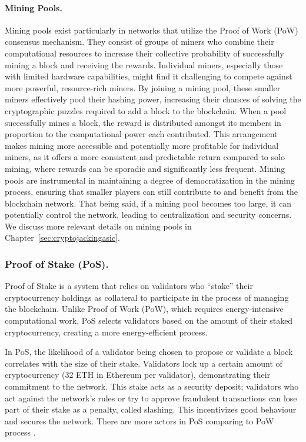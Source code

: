 \paragraph{Mining Pools.}
Mining pools exist particularly in networks that utilize the Proof of Work (PoW) consensus mechanism. They consist of groups of miners who combine their computational resources to increase their collective probability of successfully mining a block and receiving the rewards. Individual miners, especially those with limited hardware capabilities, might find it challenging to compete against more powerful, resource-rich miners. By joining a mining pool, these smaller miners effectively pool their hashing power, increasing their chances of solving the cryptographic puzzles required to add a block to the blockchain. When a pool successfully mines a block, the reward is distributed amongst its members in proportion to the computational power each contributed. This arrangement makes mining more accessible and potentially more profitable for individual miners, as it offers a more consistent and predictable return compared to solo mining, where rewards can be sporadic and significantly less frequent. Mining pools are instrumental in maintaining a degree of democratization in the mining process, ensuring that smaller players can still contribute to and benefit from the blockchain network. That being said, if a mining pool becomes too large, it can potentially control the network, leading to centralization and security concerns. We discuss more relevant details on mining pools in Chapter~\ref{sec:cryptojackingasic}.



\subsubsection{Proof of Stake (PoS).}
Proof of Stake is a system that relies on validators who ``stake'' their cryptocurrency holdings as collateral to participate in the process of managing the blockchain. Unlike Proof of Work (PoW), which requires energy-intensive computational work, PoS selects validators based on the amount of their staked cryptocurrency, creating a more energy-efficient process.

In PoS, the likelihood of a validator being chosen to propose or validate a block correlates with the size of their stake. Validators lock up a certain amount of cryptocurrency (32 ETH in Ethereum per validator), demonstrating their commitment to the network. This stake acts as a security deposit; validators who act against the network's rules or try to approve fraudulent transactions can lose part of their stake as a penalty, called slashing. This incentivizes good behaviour and secures the network. There are more actors in PoS comparing to PoW process .

